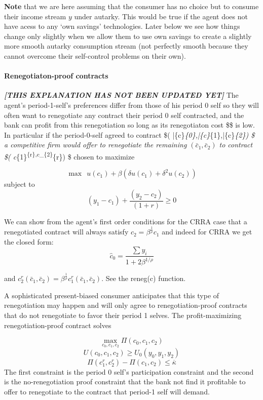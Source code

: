 \documentclass[11pt]{article}
\begin{document}
\textbf{Note} that we are here assuming that the consumer has no choice
but to consume their income stream \(y\) under autarky. This would be
true if the agent does not have acess to any `own savings' technologies.
Later below we see how things change only slightly when we allow them to
use own savings to create a slightly more smooth autarky consumption
stream (not perfectly smooth because they cannot overcome their
self-control problems on their own).

    \hypertarget{renegotiaton-proof-contracts}{%
\paragraph{Renegotiaton-proof
contracts}\label{renegotiaton-proof-contracts}}

    \textbf{\emph{{[}THIS EXPLANATION HAS NOT BEEN UPDATED YET{]}}} The
agent's period-1-self's preferences differ from those of his period 0
self so they will often want to renegotiate any contract their period 0
self contracted, and the bank can profit from this renegotiation so long
as its renegotiaton cost \$\kappa \$ is low. In particular if the
period-0-self agreed to contract \$\left(
\bar\{c\}\emph{\{0\},\bar\{c\}}\{1\},\bar\{c\}\emph{\{2\}\right) \$ a
competitive firm would offer to renegotiate the remaining
\((\bar{c}_{1},\bar{c}_{2})\) to contract \$\left(
c}\{1\}\textsuperscript{\{r\},c\_\{2\}}\{r\}\right) \$ chosen to
maximize

\[\max \ \ u(c_{1})+\beta (\delta u(c_{1}) +\delta^{2} u(c_{2})) \]
subject to \[(y_{1}-c_{1})+\frac{(y_{2}-c_{2})}{(1+r)} \geq 0\]

We can show from the agent's first order conditions for the CRRA case
that a renegotiated contract will always satisfy
\(c_{2}=\beta ^{\frac{1}{\rho }}c_{1}\) and indeed for CRRA we get the
closed form: \[ \hat{c}_{0} =\frac{\sum y_{i}}{1+2\beta^{1/\rho}}\]

and
\(c_{2}^{r}(\bar{c}_{1},\bar{c}_{2})=\beta ^{\frac{1}{\rho }}c_{1}^{r}(\bar{c}_{1},\bar{c}_{2})\).
See the reneg(c) function.

A sophisticated present-biased consumer anticipates that this type of
renegotiation may happen and will only agree to renegotiation-proof
contracts that do not renegotiate to favor their period 1 selves. The
profit-maximizing renegotiation-proof contract solves

\[\max_{c_{0},c_{1},c_{2}}\Pi \left( c_{0},c_{1},c_{2}\right) \]
\[U(c_{0},c_{1},c_{2})\geq U_{0}(y_{0},y_{1},y_{2})\]
\[\Pi \left( c_{1}^{r},c_{2}^{r}\right) -\Pi \left( c_{1},c_{2}\right) \leq \overline{\kappa }\]
The first constraint is the period 0 self's participation constraint and
the second is the no-renegotiation proof constraint that the bank not
find it profitable to offer to renegotiate to the contract that period-1
self will demand.
\end{document}
